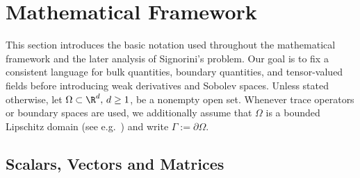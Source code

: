 \section{Mathematical Framework}

This section introduces the basic notation used throughout the mathematical framework and the later analysis of Signorini's problem. Our goal is to fix a consistent language for bulk quantities, boundary quantities, and tensor-valued fields before introducing weak derivatives and Sobolev spaces. Unless stated otherwise, let $\Omega\subset\R^d,\,d\ge 1$, be a nonempty open set. Whenever trace operators or boundary spaces are used, we additionally assume that $\Omega$ is a bounded Lipschitz domain (see e.g.\ \cite[Section 2.3]{book}) and write $\Gamma:=\partial\Omega$.

\subsection{Scalars, Vectors and Matrices}\label{sec:SVM}

